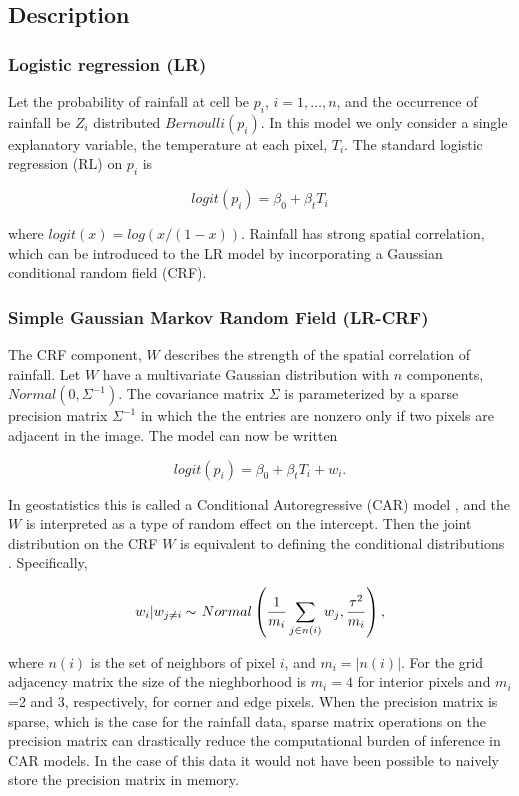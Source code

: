 \subsection{Description}

\subsubsection{Logistic regression (LR)}

Let the probability of rainfall at cell be $p_i$, $i=1,\ldots,n$, and the occurrence of rainfall be $Z_i$ distributed $Bernoulli(p_i)$. In this model we only consider a single explanatory variable, the temperature at each pixel, $T_i$. The standard logistic regression (RL) on $p_i$ is

$$
logit(p_i) = \beta_0 + \beta_t  T_i
$$

where $logit(x)=log(x/(1-x))$. Rainfall has strong spatial correlation, which can be introduced to the LR model by incorporating a Gaussian conditional random field (CRF). 

\subsubsection{Simple Gaussian Markov Random Field (LR-CRF)}

The CRF component, $W$ describes the strength of the spatial correlation of rainfall. Let $W$ have a multivariate Gaussian distribution with $n$ components, $Normal(0, \Sigma^{-1})$. The covariance matrix $\Sigma$ is parameterized by a sparse precision matrix $\Sigma^{-1}$ in which the the entries are nonzero only if two pixels are adjacent in the image. The model can now be written

$$
logit(p_i) = \beta_0 + \beta_t T_i + w_i.
$$

In geostatistics this is called a Conditional Autoregressive (CAR) model \cite{Waller2010}, and the $W$ is interpreted as a type of random effect on the intercept. Then the joint distribution on the CRF $W$ is equivalent to defining the conditional distributions \cite{Besag74}. Specifically,

$$
w_i | w_{j \neq i} \distas{} \, Normal\left( \frac{1}{m_i} \sum_{j \in n(i)} w_j, \frac{\tau^2}{m_i} \right),
$$

where $n(i)$ is the set of neighbors of pixel $i$, and $m_i=|n(i)|$. For the grid adjacency matrix the size of the nieghborhood is $m_i=4$ for interior pixels and $m_i$=2 and 3, respectively, for corner and edge pixels. When the precision matrix is sparse, which is the case for the rainfall data, sparse matrix operations on the precision matrix can drastically reduce the computational burden of inference in CAR models. In the case of this data it would not have been possible to naively store the precision matrix in memory.

